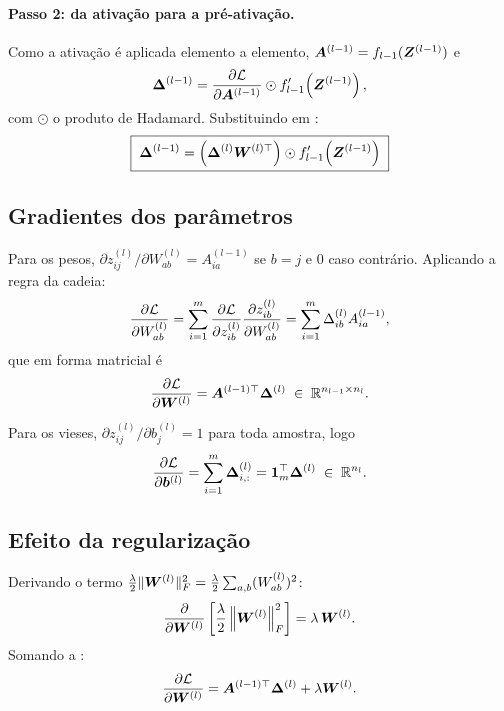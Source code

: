 \paragraph{Passo 2: da ativação para a pré-ativação.} Como a ativação é aplicada elemento a
elemento, $\bm{A}^{(l-1)} = f_{l-1}(\bm{Z}^{(l-1)})$ e
\begin{equation}
	\bm{\Delta}^{(l-1)} = \frac{\partial \mathcal{L}}{\partial \bm{A}^{(l-1)}} \odot f_{l-1}'\!\left(\bm{Z}^{(l-1)}\right),
	\label{eq:ap-rec}
\end{equation}
com $\odot$ o produto de Hadamard. Substituindo  em :
\begin{equation}
	\boxed{\;\bm{\Delta}^{(l-1)} = \left(\bm{\Delta}^{(l)}\bm{W}^{(l)\top}\right)\odot f_{l-1}'\!\left(\bm{Z}^{(l-1)}\right)\;}
	\label{eq:ap-rec-final}
\end{equation}

\subsection{Gradientes dos parâmetros}

Para os pesos, $\partial z_{ij}^{(l)}/\partial W_{ab}^{(l)} = A_{ia}^{(l-1)}$ se $b=j$ e $0$ caso
contrário. Aplicando a regra da cadeia:
\begin{equation}
	\frac{\partial \mathcal{L}}{\partial W_{ab}^{(l)}}
	= \sum_{i=1}^{m}\frac{\partial \mathcal{L}}{\partial z_{ib}^{(l)}}\frac{\partial z_{ib}^{(l)}}{\partial W_{ab}^{(l)}}
	= \sum_{i=1}^{m}\Delta_{ib}^{(l)}A_{ia}^{(l-1)},
\end{equation}
que em forma matricial é
\begin{equation}
	\frac{\partial \mathcal{L}}{\partial \bm{W}^{(l)}} = \bm{A}^{(l-1)\top}\bm{\Delta}^{(l)} \;\in\; \mathbb{R}^{n_{l-1}\times n_l}.
	\label{eq:ap-gradW}
\end{equation}

Para os vieses, $\partial z_{ij}^{(l)}/\partial b_j^{(l)} = 1$ para toda amostra, logo
\begin{equation}
	\frac{\partial \mathcal{L}}{\partial \bm{b}^{(l)}} = \sum_{i=1}^{m}\bm{\Delta}^{(l)}_{i,:}
	= \mathbf{1}_m^{\top}\bm{\Delta}^{(l)} \;\in\; \mathbb{R}^{n_l}.
	\label{eq:ap-gradb}
\end{equation}

\subsection{Efeito da regularização}

Derivando o termo $\frac{\lambda}{2}\|\bm{W}^{(l)}\|_F^2 = \frac{\lambda}{2}\sum_{a,b}(W_{ab}^{(l)})^2$:
\begin{equation}
	\frac{\partial}{\partial \bm{W}^{(l)}}\left[\frac{\lambda}{2}\left\|\bm{W}^{(l)}\right\|_F^2\right]
	= \lambda\,\bm{W}^{(l)}.
\end{equation}
Somando a :
\begin{equation}
	\frac{\partial \mathcal{L}}{\partial \bm{W}^{(l)}} = \bm{A}^{(l-1)\top}\bm{\Delta}^{(l)} + \lambda\bm{W}^{(l)}.
	\label{eq:ap-gradW-reg}
\end{equation}

